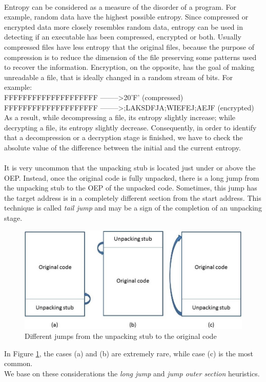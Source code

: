 \paragraph{}
Entropy can be considered as a measure of the disorder of a program. For example, random data have the highest possible entropy. Since compressed or encrypted data more closely resembles random data, entropy can be used in detecting if an executable has been compressed, encrypted or both. Usually compressed files have less entropy that the original files, because the purpose of compression is to reduce the dimension of the file preserving some patterns used to recover the information. Encryption, on the opposite, has the goal of making unreadable a file, that is ideally changed in a random stream of bits. For example:\\
FFFFFFFFFFFFFFFFFFFF --------\textgreater 20'F' (compressed)\\
FFFFFFFFFFFFFFFFFFFF --------\textgreater ;LAKSDFJA;WIEFEJ;AEJF (encrypted)\\
As a result, while decompressing a file, its entropy slightly increase; while decrypting a file, its entropy slightly decrease. Consequently, in order to identify that a decompression or a decryption stage is finished, we have to check the absolute value of the difference between the initial and the current entropy.
\paragraph{}
It is very uncommon that the unpacking stub is located just under or above the OEP. Instead, once the original code is fully unpacked, there is a long jump from the unpacking stub to the OEP of the unpacked code. Sometimes, this jump has the target address is in a completely different section from the start address. This technique is called \textit{tail jump} and may be a sign of the completion of an unpacking stage. 
\begin{figure}[!ht]
	\begin{center}
   		\includegraphics [width=\textwidth]{./pictures/Original Code And Unpacking Stub.jpg}
	\end{center}
	\caption{Different jumps from the unpacking stub to the original code}
	\label{Original Code And Unpacking Stub}
\end{figure}
In Figure \ref{Original Code And Unpacking Stub}, the cases (a) and (b) are extremely rare, while case (c) is the most common.\\
We base on these considerations the \textit{long jump} and \textit{jump outer section} heuristics.
